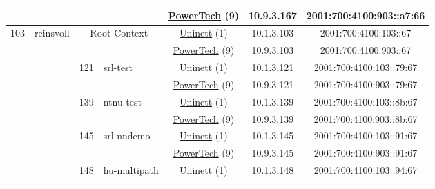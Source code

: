 \begin{small}
\begin{center}
\begin{longtable}{|c|c|c|c|c|c|c|c|}
  &  &  &  & \multicolumn{2}{|c|}{\tiny{\href{http://www.powertech.no}{PowerTech} (9)}} & \tiny{10.9.3.167} & \tiny{2001:700:4100:903::a7:66} \\ \hline
 \multirow{16}{*}{\tiny{103}} & \multicolumn{1}{|l|}{\multirow{16}{*}{\tiny{reinsvoll}}} & \multicolumn{2}{|c|}{\multirow{2}{*}{\tiny{Root Context}}} & \multicolumn{2}{|c|}{\tiny{\href{https://www.uninett.no}{Uninett} (1)}} & \tiny{10.1.3.103} & \tiny{2001:700:4100:103::67} \\* \cline{5-5}\cline{6-6}\cline{7-7}\cline{8-8}
  &  & \multicolumn{2}{|c|}{} & \multicolumn{2}{|c|}{\tiny{\href{http://www.powertech.no}{PowerTech} (9)}} & \tiny{10.9.3.103} & \tiny{2001:700:4100:903::67} \\* \cline{3-3}\cline{4-4}\cline{5-5}\cline{6-6}\cline{7-7}\cline{8-8}
  &  & \multirow{2}{*}{\tiny{121}} & \multicolumn{1}{|l|}{\multirow{2}{*}{\tiny{srl-test}}} & \multicolumn{2}{|c|}{\tiny{\href{https://www.uninett.no}{Uninett} (1)}} & \tiny{10.1.3.121} & \tiny{2001:700:4100:103::79:67} \\* \cline{5-5}\cline{6-6}\cline{7-7}\cline{8-8}
  &  &  &  & \multicolumn{2}{|c|}{\tiny{\href{http://www.powertech.no}{PowerTech} (9)}} & \tiny{10.9.3.121} & \tiny{2001:700:4100:903::79:67} \\* \cline{3-3}\cline{4-4}\cline{5-5}\cline{6-6}\cline{7-7}\cline{8-8}
  &  & \multirow{2}{*}{\tiny{139}} & \multicolumn{1}{|l|}{\multirow{2}{*}{\tiny{ntnu-test}}} & \multicolumn{2}{|c|}{\tiny{\href{https://www.uninett.no}{Uninett} (1)}} & \tiny{10.1.3.139} & \tiny{2001:700:4100:103::8b:67} \\* \cline{5-5}\cline{6-6}\cline{7-7}\cline{8-8}
  &  &  &  & \multicolumn{2}{|c|}{\tiny{\href{http://www.powertech.no}{PowerTech} (9)}} & \tiny{10.9.3.139} & \tiny{2001:700:4100:903::8b:67} \\* \cline{3-3}\cline{4-4}\cline{5-5}\cline{6-6}\cline{7-7}\cline{8-8}
  &  & \multirow{2}{*}{\tiny{145}} & \multicolumn{1}{|l|}{\multirow{2}{*}{\tiny{srl-nndemo}}} & \multicolumn{2}{|c|}{\tiny{\href{https://www.uninett.no}{Uninett} (1)}} & \tiny{10.1.3.145} & \tiny{2001:700:4100:103::91:67} \\* \cline{5-5}\cline{6-6}\cline{7-7}\cline{8-8}
  &  &  &  & \multicolumn{2}{|c|}{\tiny{\href{http://www.powertech.no}{PowerTech} (9)}} & \tiny{10.9.3.145} & \tiny{2001:700:4100:903::91:67} \\* \cline{3-3}\cline{4-4}\cline{5-5}\cline{6-6}\cline{7-7}\cline{8-8}
  &  & \multirow{2}{*}{\tiny{148}} & \multicolumn{1}{|l|}{\multirow{2}{*}{\tiny{hu-multipath}}} & \multicolumn{2}{|c|}{\tiny{\href{https://www.uninett.no}{Uninett} (1)}} & \tiny{10.1.3.148} & \tiny{2001:700:4100:103::94:67} \\* \cline{5-5}\cline{6-6}\cline{7-7}\cline{8-8}

\end{longtable}
\end{center}
\end{small}
